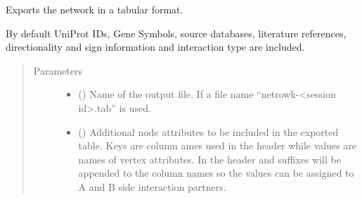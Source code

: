 \documentclass[letterpaper,10pt,english]{sphinxmanual}
\begin{document}
\begin{fulllineitems}

\begin{fulllineitems}
\label{\detokenize{main:pypath.main.PyPath.export_sif}}
\end{fulllineitems}


\begin{fulllineitems}
\label{\detokenize{main:pypath.main.PyPath.export_struct_tab}}
\end{fulllineitems}


\begin{fulllineitems}
\label{\detokenize{main:pypath.main.PyPath.export_tab}}
Exports the network in a tabular format.

By default UniProt IDs, Gene Symbols, source databases, literature
references, directionality and sign information and interaction type
are included.
\begin{quote}\begin{description}
\item[{Parameters}] \leavevmode\begin{itemize}
\item {} 
 () \textendash{} Name of the output file. If  a file name
“netrowk-\textless{}session id\textgreater{}.tab” is used.

\item {} 
 () \textendash{} Additional node attributes to be included in the exported table.
Keys are column ames used in the header while values are names
of vertex attributes. In the header  and  suffixes will
be appended to the column names so the values can be assigned to
A and B side interaction partners.


\end{itemize}
\end{description}
\end{quote}
\end{fulllineitems}
\end{fulllineitems}
\end{document}
